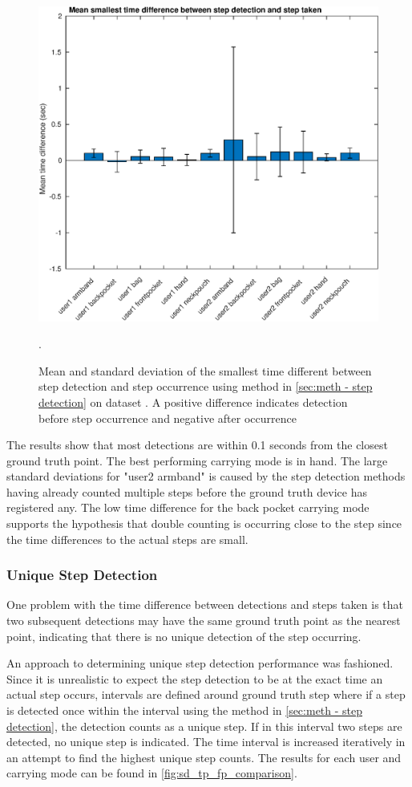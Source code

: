 \begin{figure}[H]
	\centering
	\includegraphics[width=0.7\linewidth]{images/20201127_1607_Mean_smallest_time_difference_between_step_detection_and_step_taken}
	\caption{Mean and standard deviation of the smallest time different between step detection and step occurrence using method in \cref{sec:meth - step detection} on \citet{Brajdic2013} dataset . A positive difference indicates detection before step occurrence and negative after occurrence}
	\label{fig:202011130914smallest_diff_to_gt_1}.
\end{figure}

The results show that most detections are within 0.1 seconds from the closest ground truth point. The best performing carrying mode is in hand. The large standard deviations for "user2 armband" is caused by the step detection methods having already counted multiple steps before the ground truth device has registered any. The low time difference for the back pocket carrying mode supports the hypothesis that double counting is occurring close to the step since the time differences to the actual steps are small.

\subsubsection{Unique Step Detection}

One problem with the time difference between detections and steps taken is that two subsequent detections may have the same ground truth point as the nearest point, indicating that there is no unique detection of the step occurring. \par 

An approach to determining unique step detection performance was fashioned. Since it is unrealistic to expect the step detection to be at the exact time an actual step occurs, intervals are defined around ground truth step where if a step is detected once within the interval using the method in \cref{sec:meth - step detection}, the detection counts as a unique step. If in this interval two steps are detected, no unique step is indicated. The time interval is increased iteratively in an attempt to find the highest unique step counts. The results for each user and carrying mode can be found in \cref{fig:sd_tp_fp_comparison}. 

